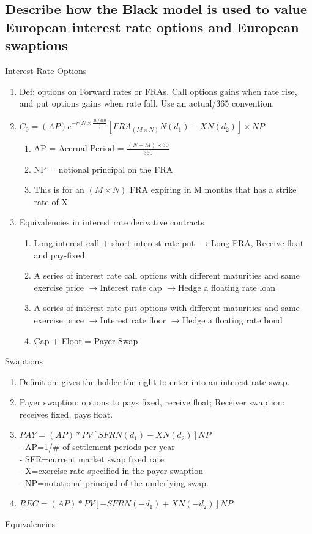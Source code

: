 \documentclass{article}
\newcommand{\be}{\begin{enumerate}}
\newcommand{\ee}{\end{enumerate}}
\newcommand{\ra}{$\rightarrow$}
\begin{document}
\subsection{Describe how the Black model is used to value European interest rate
options and European swaptions}
Interest Rate Options
\be
    \item Def: options on Forward rates or FRAs. Call options gains when rate rise, and put
    options gains when rate fall. Use an actual/365 convention.
    \item $C_0=(AP)e^{-r(N\times \frac{30/360})}[FRA_{(M\times N)} N(d_1) - XN(d_2)]\times NP$
    \be
        \item AP = Accrual Period = $\frac{(N-M)\times 30}{360}$
        \item NP = notional principal on the FRA
        \item This is for an $(M\times N)$ FRA expiring in M months that has a strike rate of X
    \ee
    \item Equivalencies in interest rate derivative contracts
    \be
        \item Long interest call + short interest rate put \ra Long FRA, Receive float and pay-fixed
        \item A series of interest rate call options with different maturities and same
        exercise price \ra Interest rate cap \ra Hedge a floating rate loan
        \item A series of interest rate put options with different maturities and same
        exercise price \ra Interest rate floor \ra Hedge a floating rate bond
        \item Cap + Floor = Payer Swap
    \ee
\ee
Swaptions
\be
    \item  Definition: gives the holder the right to enter into an interest rate swap.
    \item Payer swaption: options to pays fixed, receive float; Receiver swaption: receives fixed, pays float.
    \item 
        $PAY = (AP)*PV[SFR N(d_1)-XN(d_2)]NP$
        \\- AP=1/\# of settlement periods per year
        \\- SFR=current market swap fixed rate
        \\- X=exercise rate specified in the payer swaption
        \\- NP=notational principal of the underlying swap.
    \item $REC = (AP)*PV[-SFR N(-d_1)+XN(-d_2)]NP$
\ee
Equivalencies
\end{document}
